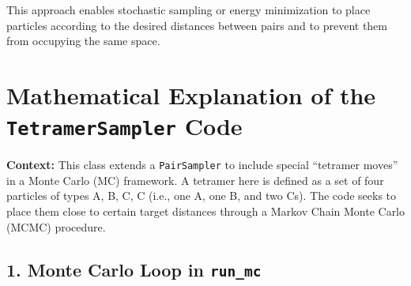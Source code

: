 \documentclass[12pt]{article}
\begin{document}
This approach enables stochastic sampling or energy minimization to place particles according to the desired distances between pairs and to prevent them from occupying the same space.
\section*{Mathematical Explanation of the \texttt{TetramerSampler} Code}

\textbf{Context:} This class extends a \texttt{PairSampler} to include special ``tetramer moves'' in a Monte Carlo (MC) framework. A tetramer here is defined as a set of four particles of types A, B, C, C (i.e., one A, one B, and two Cs). The code seeks to place them close to certain target distances through a Markov Chain Monte Carlo (MCMC) procedure.

\subsection*{1. Monte Carlo Loop in \texttt{run\_mc}}
\end{document}
